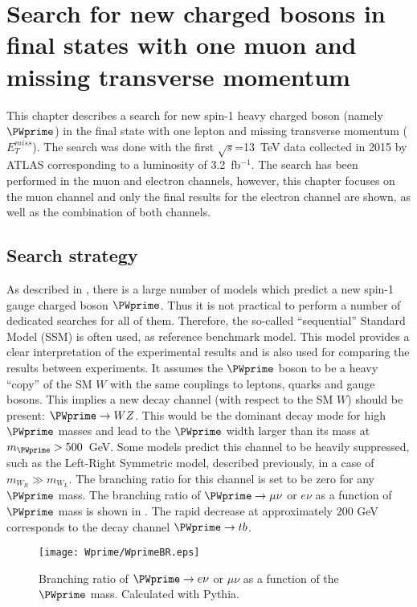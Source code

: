 \chapter{Search for new charged bosons in final states with one muon and missing transverse momentum}
\label{chap:Wprime}



This chapter describes a search for new spin-1 heavy charged boson (namely $\PWprime$) in the final state with one lepton and missing transverse momentum ($E_T^{miss}$).
The search was done with the first $\sqrt{s}$=13~TeV data collected in 2015 by ATLAS corresponding to a luminosity of 3.2~fb$^{-1}$. The search has been performed in the muon and electron channels, however, this chapter focuses on the muon channel and only the final results for the electron channel are shown, as well as the combination of both channels.



\section{Search strategy}
\label{sec:wprimeIntro} 

As described in , there is a large number of models
which predict a new spin-1 gauge charged boson $\PWprime$. Thus it is not practical to perform a number of dedicated searches for all of them. Therefore, the so-called ``sequential'' Standard Model (SSM) is often used, as reference benchmark model.
This model provides a clear interpretation of the experimental results and
is also used for comparing the results between experiments.
It assumes the $\PWprime$ boson to be a heavy ``copy'' of the SM $W$ with the same couplings to leptons, quarks and gauge bosons. 
This implies a new decay channel (with respect to the SM $W$)
should be present: $\PWprime \to WZ$. This would be the dominant decay mode 
for high $\PWprime$ masses and lead to the $\PWprime$ width larger
than its mass at  $m_{\PWprime} > 500$~GeV. 
Some models predict this channel to be heavily suppressed, 
such as the Left-Right Symmetric model, described previously, in a case of $m_{W_R} \gg m_{W_L}$.
The branching ratio for this channel is set to be zero for any $\PWprime$ mass.
The branching ratio of $\PWprime \to \mu\nu$ or $e\nu$ as a function of $\PWprime$ mass
is shown in . The rapid decrease at approximately 200 GeV corresponds to the decay channel $\PWprime \to tb$.
\begin{figure}[!htb]
  \centering
  \texttt{[image: Wprime/WprimeBR.eps]}
  \caption{Branching ratio of $\PWprime \rightarrow e\nu$ or $\mu\nu$ as a function of the $\PWprime$ mass. Calculated with Pythia.}
  \label{fig:wprimeBR}
\end{figure}

